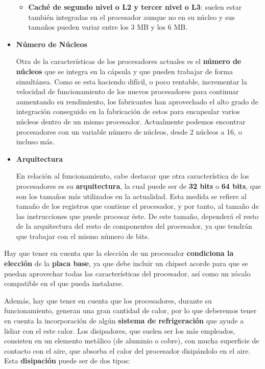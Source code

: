 \begin{itemize}
\begin{itemize}
        \item \textbf{Caché de segundo nivel o L2 y tercer nivel o L3}: suelen estar también integradas en el procesador aunque no en su núcleo y sus tamaños pueden variar entre los 3 MB y los 6 MB.
    \end{itemize}

    \item \textbf{Número de Núcleos}

    Otra de la características de los procesadores actuales es el \textbf{número de núcleos} que se integra en la cápsula y que pueden trabajar de forma simultánea. Como se esta haciendo difícil, o poco rentable, incrementar la velocidad de funcionamiento de los nuevos procesadores para continuar aumentando su rendimiento, los fabricantes han aprovechado el alto grado de integración conseguido en la fabricación de estos para encapsular varios núcleos dentro de un mismo procesador. Actualmente podemos encontrar procesadores con un variable número de núcleos, desde 2 núcleos a 16, o incluso más.

    \item \textbf{Arquitectura}

    En relación al funcionamiento, cabe destacar que otra característica de los procesadores es su \textbf{arquitectura}, la cual puede ser de \textbf{32 bits} o \textbf{64 bits}, que son los tamaños más utilizados en la actualidad. Esta medida se refiere al tamaño de los registros que contiene el procesador, y por tanto, al tamaño de las instrucciones que puede procesar éste. De este tamaño, dependerá el resto de la arquitectura del resto de componentes del procesador, ya que tendrán que trabajar con el mismo número de bits.
\end{itemize}

Hay que tener en cuenta que la elección de un procesador \textbf{condiciona la elección} de la \textbf{placa base}, ya que debe incluir un chipset acorde para que se puedan aprovechar todas las características del procesador, así como un zócalo compatible en el que pueda instalarse.

Además, hay que tener en cuenta que los procesadores, durante su funcionamiento, generan una gran cantidad de calor, por lo que deberemos tener en cuenta la incorporación de algún \textbf{sistema de refrigeración} que ayude a lidiar con el este calor. Los disipadores, que suelen ser los más empleados, consisten en un elemento metálico (de aluminio o cobre), con mucha superficie de contacto con el aire, que absorba el calor del procesador disipándolo en el aire. Esta \textbf{disipación} puede ser de dos tipos:


